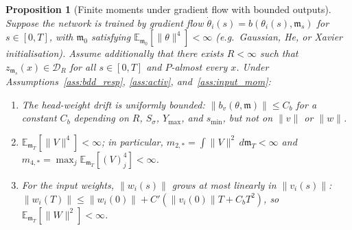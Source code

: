 \documentclass[11pt]{article}
\newtheorem{proposition}[theorem]{Proposition}
\newcommand{\E}{\mathbb{E}}
\newcommand{\cB}{\mathcal{B}}
\newcommand{\cD}{\mathcal{D}}  %
\begin{document}
\begin{proposition}[Finite moments under gradient flow with bounded outputs]\label{prop:a6_auto}
Suppose the network is trained by gradient flow
$\dot\theta_i(s) = b(\theta_i(s), \mathfrak{m}_s)$ for
$s \in [0,T]$, with $\mathfrak{m}_0$ satisfying
$\E_{\mathfrak{m}_0}[\|\theta\|^4] < \infty$
(e.g.\ Gaussian, He, or Xavier initialisation).
Assume additionally that there exists $R < \infty$ such that
$z_{\mathfrak{m}_s}(x) \in \cD_R$ for all $s \in [0,T]$ and
$P$-almost every $x$.
Under Assumptions~\ref{ass:bdd_resp}, \ref{ass:activ},
and~\ref{ass:input_mom}:
\begin{enumerate}[label=(\roman*),leftmargin=*,itemsep=2pt]
  \item The head-weight drift is uniformly bounded:
    $\|b_v(\theta, \mathfrak{m})\| \le C_b$
    for a constant $C_b$ depending on $R$, $S_\sigma$, $Y_{\max}$,
    and $s_{\min}$, but not on $\|v\|$ or $\|w\|$.
  \item $\E_{\mathfrak{m}_T}[\|V\|^4] < \infty$;
    in particular, $m_{2,*} = \int\|V\|^2\,d\mathfrak{m}_T < \infty$
    and $m_{4,*} = \max_j \E_{\mathfrak{m}_T}[(V)_j^4] < \infty$.
  \item For the input weights, $\|w_i(s)\|$ grows at most linearly
    in $\|v_i(s)\|$:
    $\|w_i(T)\| \le \|w_i(0)\| + C'(\|v_i(0)\|T + C_b T^2)$,
    so $\E_{\mathfrak{m}_T}[\|W\|^2] < \infty$.
\end{enumerate}
\end{proposition}
\end{document}
